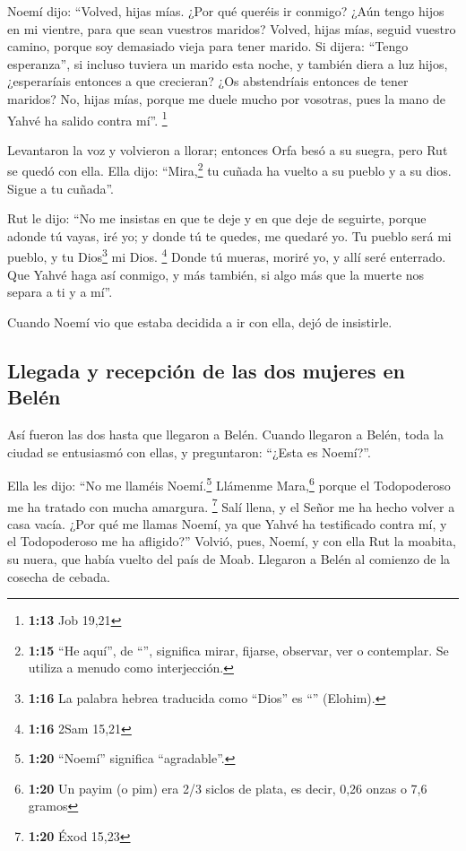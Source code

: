 \begin{paracol}{2}
 Noemí dijo: ``Volved, hijas mías. ¿Por qué queréis ir
conmigo? ¿Aún tengo hijos en mi vientre, para que sean vuestros maridos?
 Volved, hijas mías, seguid vuestro camino, porque soy
demasiado vieja para tener marido. Si dijera: ``Tengo esperanza'', si
incluso tuviera un marido esta noche, y también diera a luz hijos,
 ¿esperaríais entonces a que crecieran? ¿Os abstendríais
entonces de tener maridos? No, hijas mías, porque me duele mucho por
vosotras, pues la mano de Yahvé ha salido contra mí''. \footnote{\textbf{1:13}
  Job 19,21}

 Levantaron la voz y volvieron a llorar; entonces Orfa
besó a su suegra, pero Rut se quedó con ella.  Ella dijo:
``Mira,\footnote{\textbf{1:15} ``He aquí'', de ``'',
  significa mirar, fijarse, observar, ver o contemplar. Se utiliza a
  menudo como interjección.} tu cuñada ha vuelto a su pueblo y a su
dios. Sigue a tu cuñada''.

 Rut le dijo: ``No me insistas en que te deje y en que
deje de seguirte, porque adonde tú vayas, iré yo; y donde tú te quedes,
me quedaré yo. Tu pueblo será mi pueblo, y tu Dios\footnote{\textbf{1:16}
  La palabra hebrea traducida como ``Dios'' es ``''
  (Elohim).} mi Dios. \footnote{\textbf{1:16} 2Sam 15,21}
 Donde tú mueras, moriré yo, y allí seré enterrado. Que
Yahvé haga así conmigo, y más también, si algo más que la muerte nos
separa a ti y a mí''.

 Cuando Noemí vio que estaba decidida a ir con ella, dejó
de insistirle.

\hypertarget{llegada-y-recepciuxf3n-de-las-dos-mujeres-en-beluxe9n}{%
\subsection{Llegada y recepción de las dos mujeres en
Belén}\label{llegada-y-recepciuxf3n-de-las-dos-mujeres-en-beluxe9n}}

 Así fueron las dos hasta que llegaron a Belén. Cuando
llegaron a Belén, toda la ciudad se entusiasmó con ellas, y preguntaron:
``¿Esta es Noemí?''.

 Ella les dijo: ``No me llaméis Noemí.\footnote{\textbf{1:20}
  ``Noemí'' significa ``agradable''.} Llámenme Mara,\footnote{\textbf{1:20}
  Un payim (o pim) era 2/3 siclos de plata, es decir, 0,26 onzas o 7,6
  gramos} porque el Todopoderoso me ha tratado con mucha amargura.
\footnote{\textbf{1:20} Éxod 15,23}  Salí llena, y el
Señor me ha hecho volver a casa vacía. ¿Por qué me llamas Noemí, ya que
Yahvé ha testificado contra mí, y el Todopoderoso me ha afligido?''
 Volvió, pues, Noemí, y con ella Rut la moabita, su
nuera, que había vuelto del país de Moab. Llegaron a Belén al comienzo
de la cosecha de cebada.


\end{paracol}
